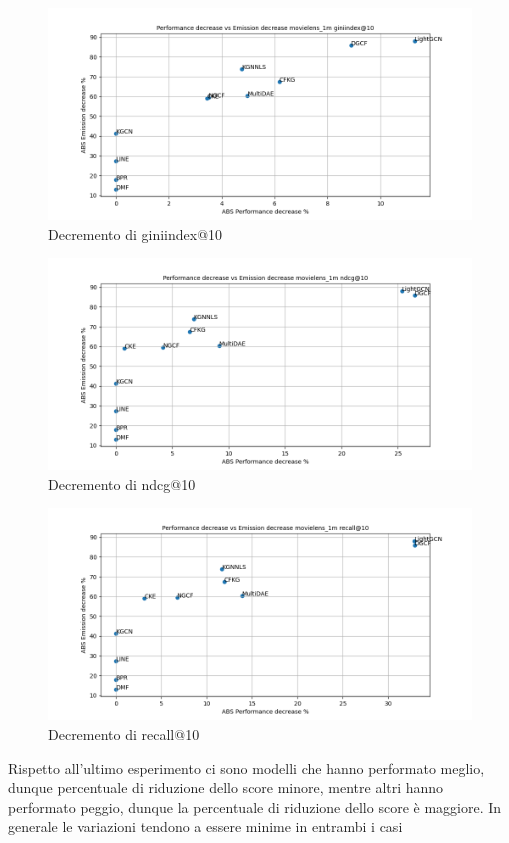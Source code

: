 \begin{figure}[H]
    \centering
    \includegraphics[scale=0.5]{images/decrement_giniindex@10_movielens_1m_40_7.png}
    \caption{Decremento di giniindex@10}
\end{figure}

\begin{figure}[H]
    \centering
    \includegraphics[scale=0.5]{images/decrement_ndcg@10_movielens_1m_40_7.png}
    \caption{Decremento di ndcg@10}
\end{figure}

\begin{figure}[H]
    \centering
    \includegraphics[scale=0.5]{images/decrement_recall@10_movielens_1m_40_7.png}
    \caption{Decremento di recall@10}
\end{figure}

\noindent Rispetto all'ultimo esperimento ci sono modelli che hanno performato meglio, dunque percentuale di riduzione dello score minore, mentre altri hanno performato peggio, dunque la percentuale di riduzione dello score è maggiore. In generale le variazioni tendono a essere minime in entrambi i casi
